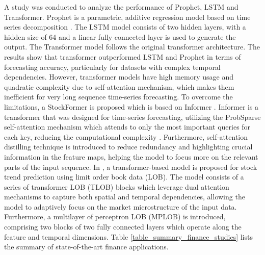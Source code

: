 \documentclass[preprint,12pt]{elsarticle}
\begin{document}
A study was conducted to analyze the performance of Prophet, LSTM and Transformer. Prophet is a parametric, additive regression model based on time series decomposition \citep{mozaffari_predictive_2024}. The LSTM model consists of two hidden layers, with a hidden size of 64 and a linear fully connected layer is used to generate the output. The Transformer model follows the original transformer architecture. The results show that transformer outperformed LSTM and Prophet in terms of forecasting accuracy, particularly for datasets with complex temporal dependencies. However, transformer models have high memory usage and quadratic complexity due to self-attention mechanism, which makes them inefficient for very long sequence time-series forecasting. To overcome the limitations, a StockFormer is proposed which is based on Informer \citep{li_transformer_2025}. Informer is a transformer that was designed for time-series forecasting, utilizing the ProbSparse self-attention mechanism which attends to only the most important queries for each key, reducing the computational complexity \citep{zhou_informer_2021}. Furthermore, self-attention distilling technique is introduced to reduce redundancy and highlighting crucial information in the feature maps, helping the model to focus more on the relevant parts of the input sequence. In \citep{berti_tlob_2025}, a transformer-based model is proposed for stock trend prediction using limit order book data (LOB). The model consists of a series of transformer LOB (TLOB) blocks which leverage dual attention mechanisms to capture both spatial and temporal dependencies, allowing the model to adaptively focus on the market microstructure of the input data. Furthermore, a multilayer of perceptron LOB (MPLOB) is introduced, comprising two blocks of two fully connected layers which operate along the feature and temporal dimensions. Table \ref{table_summary_finance_studies} lists the summary of state-of-the-art finance applications.
\end{document}
